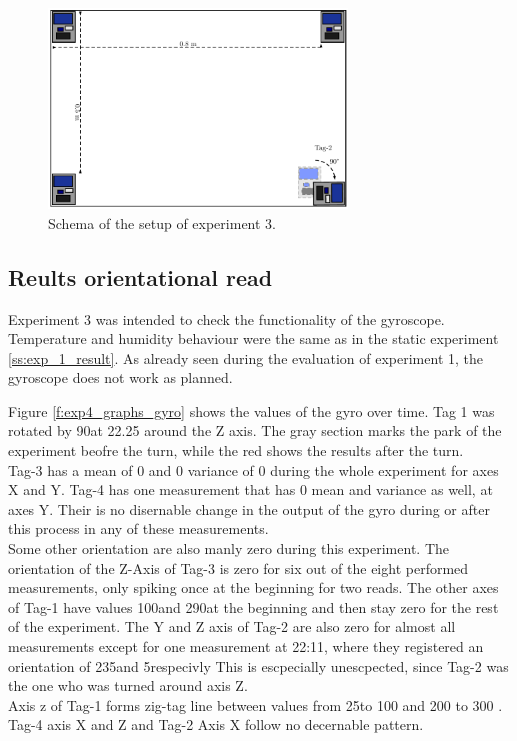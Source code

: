 \begin{figure}[ht!]
	\centering
	\includegraphics[width=300px]{graphics/schematics/experiment_3.pdf}
	\caption{Schema of the setup of experiment 3.}
	\label{f:exp3_schematic}
\end{figure}


\subsection{Reults orientational read}
\label{ss:exp_3_result}
Experiment 3 was intended to check the functionality of the gyroscope.
Temperature and humidity behaviour were the same as in the static experiment \ref{ss:exp_1_result}.
As already seen during the evaluation of experiment 1, the gyroscope does not work as planned.


Figure \ref{f:exp4_graphs_gyro} shows the values of the gyro over time.
Tag 1 was rotated by 90\degree  at 22.25 around the Z axis.
The gray section marks the park of the experiment beofre the turn, while the red shows the results after the turn. \\
Tag-3 has a mean of 0 and 0 variance of 0 during the whole experiment for axes X and Y.
Tag-4 has one measurement that has 0 mean and variance as well, at axes Y.
Their is no disernable change in the output of the gyro during or after this process in any of these measurements. \\
Some other orientation are also manly zero during this experiment.
The orientation of the Z-Axis of Tag-3 is zero for six out of the eight performed measurements, only spiking once at the beginning for two reads.
The other axes of Tag-1 have values 100\degree and 290\degree at the beginning and then stay zero for the rest of the experiment.
The Y and Z axis of Tag-2 are also zero for almost all measurements except for one measurement at 22:11, where they registered an orientation of 235\degree and 5\degree respecivly
This is escpecially unescpected, since Tag-2 was the one who was turned around axis Z. \\
Axis z of Tag-1 forms zig-tag line between values from 25\degree to 100 \degree and 200 \degree to 300 \degree.
Tag-4 axis X and Z and Tag-2 Axis X follow no decernable pattern.


